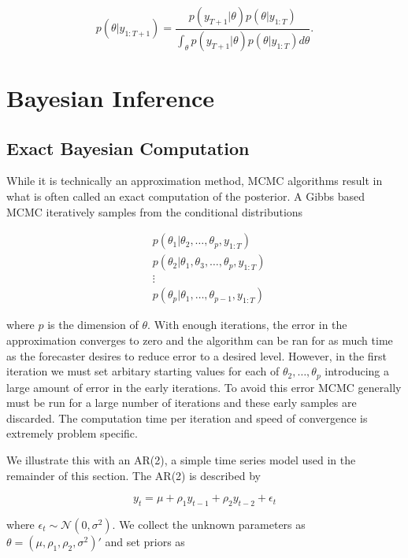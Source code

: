\documentclass{article}\usepackage[]{graphicx}\usepackage[]{color}
\numberwithin{equation}{section}
\begin{document}
\begin{equation}
\label{posteriorupdate}
p(\theta | y_{1:T+1}) = \frac{p(y_{T+1} | \theta) p(\theta | y_{1:T})}{\int_\theta p(y_{T+1} | \theta) p(\theta | y_{1:T}) d\theta}.
\end{equation}

\section{Bayesian Inference}
\subsection{Exact Bayesian Computation}
While it is technically an approximation method, MCMC algorithms result in what is often called an exact computation of the posterior. A Gibbs based MCMC iteratively samples from the conditional distributions

\begin{align}
&p(\theta_1 | \theta_2, \dots, \theta_p, y_{1:T}) \nonumber \\
&p(\theta_2 | \theta_1, \theta_3, \dots, \theta_p, y_{1:T}) \nonumber \\
&\vdots \nonumber \\
&p(\theta_p | \theta_1, \dots, \theta_{p-1}, y_{1:T}) \nonumber
\end{align}

where $p$ is the dimension of $\theta$. With enough iterations, the error in the approximation converges to zero and the algorithm can be ran for as much time as the forecaster desires to reduce error to a desired level. However, in the first iteration we must set arbitary starting values for each of $\theta_2, \dots, \theta_p$ introducing a large amount of error in the early iterations. To avoid this error MCMC generally must be run for a large number of iterations and these early samples are discarded. The computation time per iteration and speed of convergence is extremely problem specific. 

We illustrate this with an AR(2), a simple time series model used in the remainder of this section. The AR(2) is described by

\begin{equation}
\label{AR2}
y_t = \mu + \rho_1 y_{t-1} + \rho_2 y_{t-2} + \epsilon_t
\end{equation}

where $\epsilon_t \sim \mathcal{N}(0, \sigma^2)$. We collect the unknown parameters as $\theta = (\mu, \rho_1, \rho_2, \sigma^2)'$ and set priors as
\end{document}
